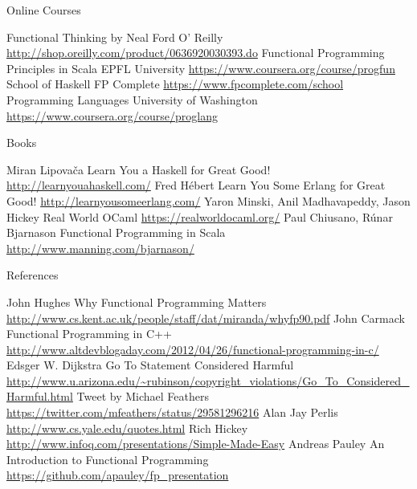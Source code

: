 \documentclass[mathserif]{beamer}
\begin{document}
\begin{frame}{Online Courses}

  \begin{thebibliography}{10}
      Functional Thinking by Neal Ford
      \newblock O' Reilly
      \newblock \url{http://shop.oreilly.com/product/0636920030393.do}
      Functional Programming Principles in Scala
      \newblock EPFL University
      \newblock \url{https://www.coursera.org/course/progfun}
      School of Haskell
      \newblock FP Complete
      \newblock \url{https://www.fpcomplete.com/school}
      Programming Languages
      \newblock University of Washington
      \newblock \url{https://www.coursera.org/course/proglang}
  \end{thebibliography}

\end{frame}

\begin{frame}{Books}

  \begin{thebibliography}{10}
      Miran Lipovača
      \newblock Learn You a Haskell for Great Good!
      \newblock \url{http://learnyouahaskell.com/}
      Fred Hébert
      \newblock Learn You Some Erlang for Great Good!
      \newblock \url{http://learnyousomeerlang.com/}
      Yaron Minski, Anil Madhavapeddy, Jason Hickey
      \newblock Real World OCaml
      \newblock \url{https://realworldocaml.org/}
      Paul Chiusano, Rúnar Bjarnason
      \newblock Functional Programming in Scala
      \newblock \url{http://www.manning.com/bjarnason/}
  \end{thebibliography}

\end{frame}

\begin{frame}[allowframebreaks]{References}
  \begin{thebibliography}{10}
      John Hughes
      \newblock Why Functional Programming Matters
      \newblock \url{http://www.cs.kent.ac.uk/people/staff/dat/miranda/whyfp90.pdf}
      John Carmack
      \newblock Functional Programming in C++
      \newblock \url{http://www.altdevblogaday.com/2012/04/26/functional-programming-in-c/}
      Edsger W. Dijkstra
      \newblock Go To Statement Considered Harmful
      \newblock \url{http://www.u.arizona.edu/~rubinson/copyright_violations/Go_To_Considered_Harmful.html}
      Tweet by Michael Feathers
      \newblock \url{https://twitter.com/mfeathers/status/29581296216}
      Alan Jay Perlis
      \newblock \url{http://www.cs.yale.edu/quotes.html}
      Rich Hickey
      \newblock \url{http://www.infoq.com/presentations/Simple-Made-Easy}
      Andreas Pauley
      \newblock An Introduction to Functional Programming
      \newblock \url{https://github.com/apauley/fp_presentation}
  \end{thebibliography}
\end{frame}
\end{document}
